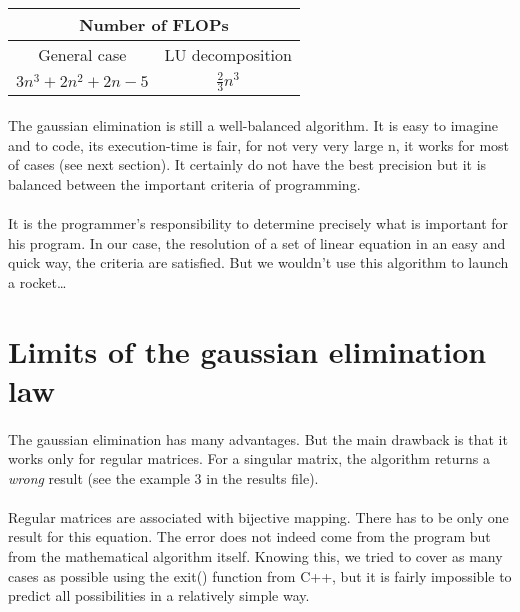 \documentclass[a4paper, twoside, 11pt]{report}
\theoremstyle{theorem}
\theoremstyle{remark}
\theoremstyle{exemple}
\begin{document}
	\paragraph{}
		\begin{center}
		\begin{tabular}{|*{2}{c|}}
  \hline
  \multicolumn{2}{|c|}{Number of FLOPs} \\
	\hline
	General case & LU decomposition\\
	\hline	
	$3n^3 + 2n^2 +2n -5$ & $\frac{2}{3} n^3$ \\
	\hline
\end{tabular}
\end{center}
	
	\paragraph{} The gaussian elimination is still a well-balanced algorithm. It is easy to imagine and to code, its execution-time is fair, for not very very large n, it works for most of cases (see next section). It certainly do not have the best precision but it is balanced between the important criteria of programming. 
	
	\paragraph{}It is the programmer's responsibility to determine precisely what is important for his program. In our case, the resolution of a set of linear equation in an easy and quick way, the criteria are satisfied. But we wouldn't use this algorithm to launch a rocket… 
	
	\section{Limits of the gaussian elimination law}
	\paragraph{} The gaussian elimination has many advantages. But the main drawback is that it works only for regular matrices. For a singular matrix, the algorithm returns a \emph{wrong} result (see the example 3 in the results file).
	\paragraph{} Regular matrices are associated with bijective mapping. There has to be only one result for this equation. The error does not indeed come from the program but from the mathematical algorithm itself. Knowing this, we tried to cover as many cases as possible using the exit() function from C++, but it is fairly impossible to predict all possibilities in a relatively simple way.
\end{document}

